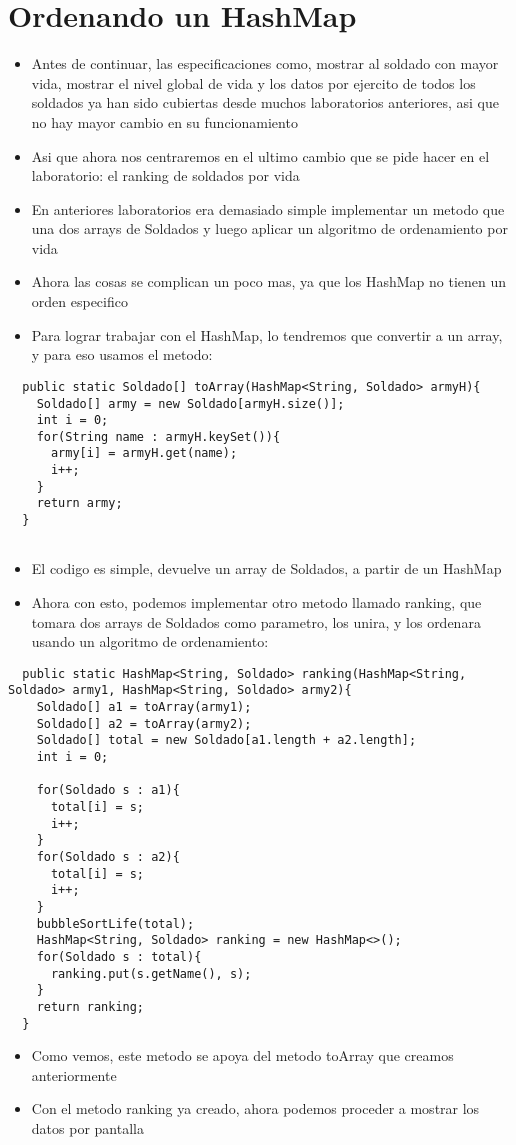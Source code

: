 \section{Ordenando un HashMap}
\begin{itemize}
  \item Antes de continuar, las especificaciones como, mostrar al soldado con mayor vida, mostrar el nivel global de vida y los datos por ejercito de todos los soldados ya han sido cubiertas desde muchos laboratorios anteriores, asi que no hay mayor cambio en su funcionamiento
  \item Asi que ahora nos centraremos en el ultimo cambio que se pide hacer en el laboratorio: el ranking de soldados por vida
  \item En anteriores laboratorios era demasiado simple implementar un metodo que una dos arrays de Soldados y luego aplicar un algoritmo de ordenamiento por vida
  \item Ahora las cosas se complican un poco mas, ya que los HashMap no tienen un orden especifico
  \item Para lograr trabajar con el HashMap, lo tendremos que convertir a un array, y para eso usamos el metodo:
\end{itemize}
\begin{lstlisting}
  public static Soldado[] toArray(HashMap<String, Soldado> armyH){
    Soldado[] army = new Soldado[armyH.size()];
    int i = 0;
    for(String name : armyH.keySet()){
      army[i] = armyH.get(name);
      i++;
    }
    return army;
  }
 
\end{lstlisting}
\begin{itemize}
  \item El codigo es simple, devuelve un array de Soldados, a partir de un HashMap
  \item Ahora con esto, podemos implementar otro metodo llamado ranking, que tomara dos arrays de Soldados como parametro, los unira, y los ordenara usando un algoritmo de ordenamiento:
\end{itemize}
\begin{lstlisting}
  public static HashMap<String, Soldado> ranking(HashMap<String, Soldado> army1, HashMap<String, Soldado> army2){
    Soldado[] a1 = toArray(army1);
    Soldado[] a2 = toArray(army2);
    Soldado[] total = new Soldado[a1.length + a2.length];
    int i = 0;

    for(Soldado s : a1){
      total[i] = s;
      i++;
    }
    for(Soldado s : a2){
      total[i] = s;
      i++;
    }
    bubbleSortLife(total);
    HashMap<String, Soldado> ranking = new HashMap<>();
    for(Soldado s : total){
      ranking.put(s.getName(), s);
    }
    return ranking;
  }
\end{lstlisting}
\begin{itemize}
  \item Como vemos, este metodo se apoya del metodo toArray que creamos anteriormente
  \item Con el metodo ranking ya creado, ahora podemos proceder a mostrar los datos por pantalla
\end{itemize}
